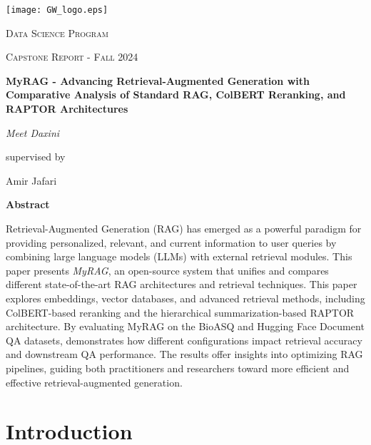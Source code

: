 \documentclass{scrartcl}
\renewenvironment{abstract}{
    \centering
    \textbf{Abstract}
    \vspace{0.5cm}
    \par\itshape
    \begin{minipage}{0.7\linewidth}}{\end{minipage}
    \noindent\ignorespaces
}
\begin{document}
\begin{titlepage}
	\centering
	\texttt{[image: GW\_logo.eps]}\par
	\vspace{2cm}
	{\scshape\LARGE Data Science Program \par}
	\vspace{1cm}
	{\scshape\Large Capstone Report - Fall 2024\par}
	\vspace{1.5cm}
	{\huge\bfseries MyRAG - Advancing Retrieval-Augmented Generation with Comparative Analysis of Standard RAG, ColBERT Reranking, and RAPTOR Architectures \par}
	\vspace{2cm}
	{\Large\itshape Meet Daxini \\}\par
	\vspace{1.5cm}
	supervised by\par
	Amir Jafari
\newpage

	\vfill
	\begin{abstract}
Retrieval-Augmented Generation (RAG) has emerged as a powerful paradigm for providing personalized, relevant, and current information to user queries by combining large language models (LLMs) with external retrieval modules. This paper presents \textit{MyRAG}, an open-source system that unifies and compares different state-of-the-art RAG architectures and retrieval techniques. This paper explores embeddings, vector databases, and advanced retrieval methods, including ColBERT-based reranking and the hierarchical summarization-based RAPTOR architecture. By evaluating MyRAG on the BioASQ and Hugging Face Document QA datasets, demonstrates how different configurations impact retrieval accuracy and downstream QA performance. The results offer insights into optimizing RAG pipelines, guiding both practitioners and researchers toward more efficient and effective retrieval-augmented generation.
	\end{abstract}
	\vfill
\end{titlepage}
\tableofcontents
\newpage
\section{Introduction}
\end{document}
